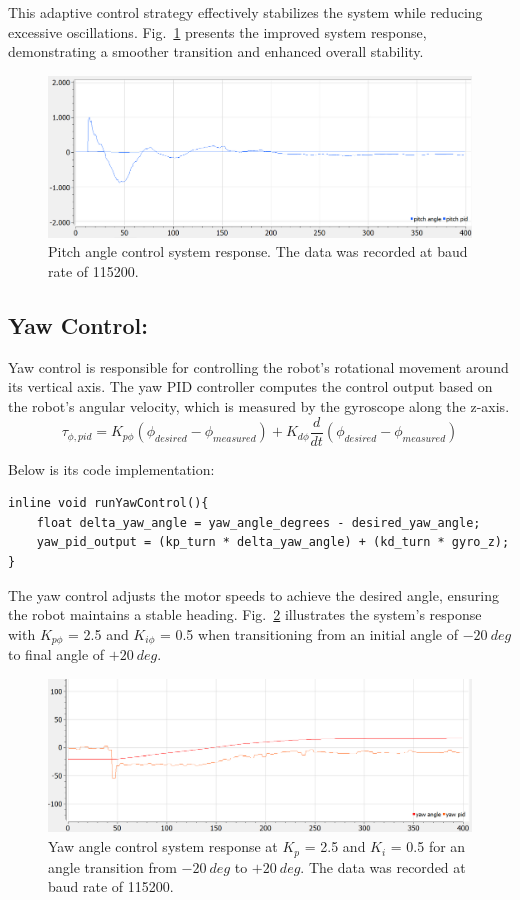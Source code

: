 This adaptive control strategy effectively stabilizes the system while reducing excessive oscillations. Fig.~\ref{fig:pid_position_combined} presents the improved system response, demonstrating a smoother transition and enhanced overall stability.
\begin{figure}[H]
	\centering
	\includegraphics[width=0.8\linewidth]{assets/pid_pitch_combined.png}
	\caption{Pitch angle control system response. The data was recorded at baud rate of 115200.}
	\label{fig:pid_position_combined}
\end{figure}


\subsection{Yaw Control:}
Yaw control is responsible for controlling the robot's rotational movement around its vertical axis. The yaw PID controller computes the control output based on the robot's angular velocity, which is measured by the gyroscope along the z-axis. 
\begin{equation}
	\tau_{\phi,pid} = K_{p\phi}(\phi_{desired} - \phi_{measured}) + K_{d\phi}\frac{d}{dt}(\phi_{desired} - \phi_{measured})
\end{equation}

Below is its code implementation:
\begin{lstlisting}[style=cppstyle2]
inline void runYawControl(){
	float delta_yaw_angle = yaw_angle_degrees - desired_yaw_angle;
	yaw_pid_output = (kp_turn * delta_yaw_angle) + (kd_turn * gyro_z);
}
\end{lstlisting}

The yaw control adjusts the motor speeds to achieve the desired angle, ensuring the robot maintains a stable heading. Fig.~\ref{fig:pid_yaw} illustrates the system's response with \(K_{p\phi}\) = 2.5 and $K_{i\phi}$ = 0.5 when transitioning from an initial angle of $-20 \ deg$ to final angle of $+20 \ deg$.
\begin{figure}[H]
	\centering
	\includegraphics[width=0.8\linewidth]{assets/pid_yaw_kp_2_5_kd_0_5_target_20_deg.png}
	\caption{Yaw angle control system response at \(K_p\) = 2.5 and $K_i$ = 0.5 for an angle transition from $-20 \ deg$ to $+20 \ deg$. The data was recorded at baud rate of 115200.}
	\label{fig:pid_yaw}
\end{figure}


